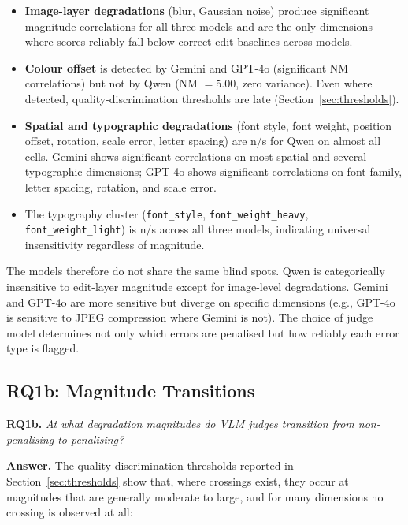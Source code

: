 \begin{itemize}
    \item \textbf{Image-layer degradations} (blur, Gaussian noise) produce significant magnitude correlations for all three models and are the only dimensions where scores reliably fall below correct-edit baselines across models.
    \item \textbf{Colour offset} is detected by Gemini and GPT-4o (significant NM correlations) but not by Qwen (NM $= 5.00$, zero variance). Even where detected, quality-discrimination thresholds are late (Section~\ref{sec:thresholds}).
    \item \textbf{Spatial and typographic degradations} (font style, font weight, position offset, rotation, scale error, letter spacing) are n/s for Qwen on almost all cells. Gemini shows significant correlations on most spatial and several typographic dimensions; GPT-4o shows significant correlations on font family, letter spacing, rotation, and scale error.
    \item The typography cluster (\texttt{font\_style}, \texttt{font\_weight\_heavy}, \texttt{font\_weight\_light}) is n/s across all three models, indicating universal insensitivity regardless of magnitude.
\end{itemize}

The models therefore do not share the same blind spots. Qwen is categorically insensitive to edit-layer magnitude except for image-level degradations. Gemini and GPT-4o are more sensitive but diverge on specific dimensions (e.g., GPT-4o is sensitive to JPEG compression where Gemini is not). The choice of judge model determines not only which errors are penalised but how reliably each error type is flagged.

\subsection*{RQ1b: Magnitude Transitions}

\textbf{RQ1b.} \textit{At what degradation magnitudes do VLM judges transition from non-penalising to penalising?}

\textbf{Answer.} The quality-discrimination thresholds reported in Section~\ref{sec:thresholds} show that, where crossings exist, they occur at magnitudes that are generally moderate to large, and for many dimensions no crossing is observed at all:

